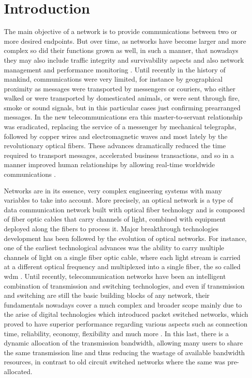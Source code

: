 \chapter{Introduction}
\label{chapter1}


The main objective of a network is to provide communications between two or more desired endpoints. But over time, as networks have become larger and more complex so did their functions grown as well, in such a manner, that nowadays they may also include traffic integrity and survivability aspects and also network management and performance monitoring \cite{Telecommunications}. Until recently in the history of mankind, communications were very limited, for instance by geographical proximity as messages were transported by messengers or couriers, who either walked or were transported by domesticated animals, or were sent through fire, smoke or sound signals, but in this particular cases just confirming prearranged messages. In the new telecommunications era this master-to-servant relationship was eradicated, replacing the service of a messenger by mechanical telegraphs, followed by copper wires and electromagnetic waves and most lately by the revolutionary optical fibers. These advances dramatically reduced the time required to transport messages, accelerated business transactions, and so in a manner improved human relationships by allowing real-time worldwide communications \cite{Telecommunications}. \par Networks are in its essence, very complex engineering systems with many variables to take into account. More precisely, an optical network is a type of data communication network built with optical fiber technology and is composed of fiber optic cables that carry channels of light, combined with equipment deployed along the fibers to process it. Major breakthrough technologies development has been followed by the evolution of optical networks. For instance, one of the earliest technological advances was the ability to carry multiple channels of light on a single fiber optic cable, where each light stream is carried at a different optical frequency and multiplexed into a single fiber, the so called \gls{wdm} \cite{SimmonsJane2008}. Until recently, telecommunication networks have been an intelligent combination of transmission and switching technologies, and even if transmission and switching are still the basic building blocks of any network, their fundamentals nowadays cover a much complex and broader scope mainly due to the arise of digital technologies which introduced packet switched networks, which proved to have superior performance regarding various aspects such as connection time, reliability, economy, flexibility and much more \cite{doi:10.1002/9780470683576.ch1}. In this last, there is a dynamic allocation of the transmission bandwidth, allowing many users to share the same transmission line and thus reducing the wastage of available bandwidth resources, in contrast to old circuit switched networks where the same was pre-allocated. %